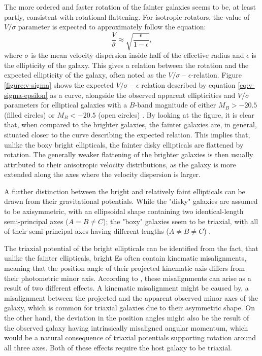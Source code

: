 \documentclass[english, twoside]{HYgradu}
\begin{document}
The more ordered and faster rotation of the fainter galaxies seems to be, at least partly, consistent with rotational flattening. For isotropic rotators, the value of $V/\sigma$ parameter is expected to approximately follow the equation:
\begin{equation}
\frac{V}{\overline{\sigma}} \approx \sqrt{\frac{\epsilon}{1-\epsilon}}, \label{eq:v-sigma-epsilon}
\end{equation}
where $\overline{\sigma}$ is the mean velocity dispersion inside half of the effective radius and $\epsilon$ is the ellipticity of the galaxy. This gives a relation between the rotation and the expected ellipticity of the galaxy, often noted as the $V/\sigma$ – $\epsilon$-relation. Figure \ref{figure:v-sigma} shows the expected $V/\sigma$ – $\epsilon$ relation described by equation \ref{eq:v-sigma-epsilon} as a curve, alongside the observed apparent ellipticities and $V/\sigma$ parameters for elliptical galaxies with a $B$-band magnitude of either $M_B > -20.5$ (filled circles) or $M_B < -20.5$ (open circles) \citep{Davies1983}. By looking at the figure, it is clear that, when compared to the brighter galaxies, the fainter galaxies are, in general, situated closer to the curve describing the expected relation. This implies that, unlike the boxy bright ellipticals, the fainter disky ellipticals are flattened by rotation. The generally weaker flattening of the brighter galaxies is then usually attributed to their anisotropic velocity distributions, as the galaxy is more extended along the axes where the velocity dispersion is larger.

A further distinction between the bright and relatively faint ellipticals can be drawn from their gravitational potentials. While the "disky" galaxies are assumed to be axisymmetric, with an ellipsoidal shape containing two identical-length semi-principal axes ($A = B \neq C$); the "boxy" galaxies seem to be triaxial, with all of their semi-principal axes having different lengths ($A \neq B \neq C$) \citep{GalaxyFormationAndEvo2010}. 

The triaxial potential of the bright ellipticals can be identified from the fact, that unlike the fainter ellipticals, bright Es often contain kinematic misalignments, meaning that the position angle of their projected kinematic axis differs from their photometric minor axis. According to \cite{GalaxyFormationAndEvo2010}, these misalignments can arise as a result of two different effects. A kinematic misalignment might be caused by, a misalignment between the projected and the apparent observed minor axes of the galaxy, which is common for triaxial galaxies due to their asymmetric shape. On the other hand, the deviation in the position angles might also be the result of the observed galaxy having intrinsically misaligned angular momentum, which would be a natural consequence of triaxial potentials supporting rotation around all three axes. Both of these effects require the host galaxy to be triaxial.
\end{document}
